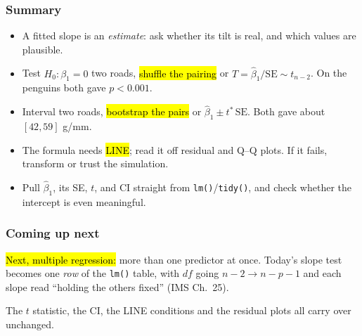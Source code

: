 \documentclass[slidestop,compress,mathserif]{beamer}
\begin{document}
\begin{frame}
\frametitle{Summary}

\begin{itemize}
\item A fitted slope is an \emph{estimate}: ask whether its tilt is real, and which values are plausible.
\item Test $H_0:\beta_1 = 0$ two roads, \hl{shuffle the pairing} or $T = \hat\beta_1/\mathrm{SE} \sim t_{n-2}$. On the penguins both gave $p < 0.001$.
\item Interval two roads, \hl{bootstrap the pairs} or $\hat\beta_1 \pm t^\ast\,\mathrm{SE}$. Both gave about $[42, 59]$ g/mm.
\item The formula needs \hl{LINE}; read it off residual and Q--Q plots. If it fails, transform or trust the simulation.
\item Pull $\hat\beta_1$, its SE, $t$, and CI straight from \texttt{lm()}/\texttt{tidy()}, and check whether the intercept is even meaningful.
\end{itemize}

\end{frame}


\begin{frame}
\frametitle{Coming up next}

\hl{Next, multiple regression:} more than one predictor at once. Today's slope test becomes one \emph{row} of the \texttt{lm()} table, with $df$ going $n-2 \to n-p-1$ and each slope read ``holding the others fixed'' (IMS Ch.\ 25).

\vspace{0.4em}
{\small The $t$ statistic, the CI, the LINE conditions and the residual plots all carry over unchanged.}

\end{frame}


\end{document}
